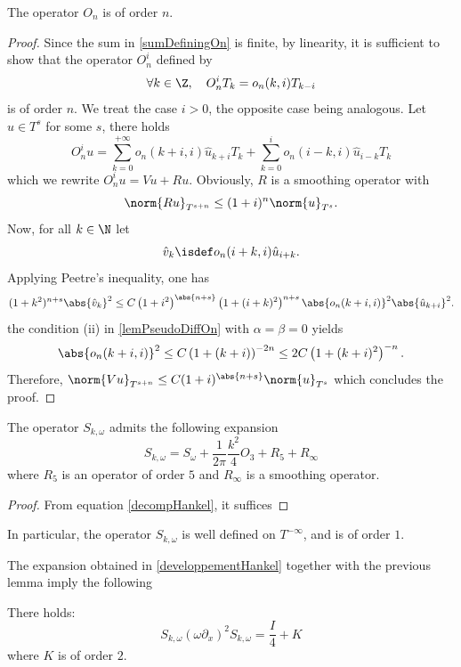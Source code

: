 \documentclass[a4paper]{article}
\begin{document}
\begin{Lem}
	\label{orderOfOn}
	The operator $O_n$ is of order $n$. 
\end{Lem}
\begin{proof}
	Since the sum in \eqref{sumDefiningOn} is finite, by linearity, it is sufficient to show that the operator $O^i_n$ defined by 
	\[ \forall k \in \Z, \quad  O^i_n T_k = o_n(k,i) T_{k-i} \]
	is of order $n$. We treat the case $i > 0$, the opposite case being analogous. Let $u \in T^s$ for some $s$, there holds 
	\[ O^i_n u = \sum_{k = 0}^{+ \infty} o_n(k + i,i)\hat{u}_{k + i}T_k + \sum_{k = 0}^{i} o_n(i - k,i) \hat{u}_{i - k}T_k\]
	which we rewrite $O_n^i u = Vu + Ru$. Obviously, $R$ is a smoothing operator with
	\[ \norm{Ru}_{T^{s + n}} \leq (1 + i)^{n} \norm{u}_{T^s}.\]
	Now, for all $k \in \N$ let
	\[\hat{v}_k \isdef o_n(i + k,i) \hat{u}_{i + k}.\]
	Applying Peetre's inequality, one has
	\[(1 + k^2)^{n + s}\abs{\hat{v}_k}^2 \leq C \left(1 + i^2\right)^{\abs{n + s}}\left(1 + (i + k)^2\right)^{n + s} \abs{o_n(k + i,i)}^2 \abs{\hat{u}_{k+i}}^2.\]
	the condition (ii) in \autoref{lemPseudoDiffOn} with $\alpha = \beta = 0$ yields
	\[\abs{o_n(k+i,i)}^2 \leq C\left(1 + (k+i)\right)^{-2n} \leq 2C \left(1 + (k+i)^2\right)^{-n}.\]
	Therefore, $\norm{V u}_{T^{s + n}} \leq C(1 + i)^{\abs{n + s}} \norm{u}_{T^s}$ which concludes the proof. 
\end{proof}
\begin{Cor}
	The operator $S_{k,\omega}$ admits the following expansion 
	\[ S_{k, \omega} = S_\omega + \frac{1}{2\pi} \frac{k^2}{4} O_3 +  R_5 + R_{\infty}\]
	\label{developpementHankel}
	where $R_5$ is an operator of order $5$ and $R_\infty$ is a smoothing operator.
\end{Cor}
\begin{proof}
	From equation \eqref{decompHankel}, it suffices 
\end{proof}
In particular, the operator $S_{k,\omega}$ is well defined on $T^{-\infty}$, and is of order $1$.

The expansion obtained in \autoref{developpementHankel} together with the previous lemma imply the following
\begin{The} There holds:
	\[S_{k,\omega}  (\omega\partial_x)^2 S_{k,\omega} = \frac{I}{4} + K\]
	where $K$ is of order $2$. 
\end{The}
\end{document}
